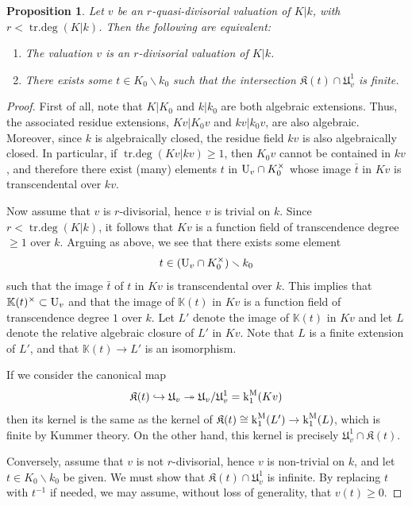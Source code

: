 \documentclass[11pt]{amsart}
\newtheorem{proposition}{Proposition}[section]
\theoremstyle{definition}
\theoremstyle{remark}
\numberwithin{equation}{section}
\DeclareMathOperator{\trdeg}{tr.deg}
\newcommand{\U}{{\rm U}}
\newcommand{\Kbb}{\mathbb{K}}
\newcommand{\Kfrak}{\mathfrak{K}}
\newcommand{\Ufrak}{\mathfrak{U}}
\renewcommand{\k}{\operatorname{k}^{\rm M}}
\begin{document}
\begin{proposition}
\label{proposition: localthy / pd / pd-detection}
  Let $v$ be an $r$-quasi-divisorial valuation of $K|k$, with $r < \trdeg(K|k)$.
  Then the following are equivalent:
  \begin{enumerate}
    \item The valuation $v$ is an $r$-divisorial valuation of $K|k$.
    \item There exists some $t \in K_0 \smallsetminus k_0$ such that the intersection $\Kfrak(t) \cap \Ufrak_v^1$ is finite.
  \end{enumerate}
\end{proposition}
\begin{proof}
  First of all, note that $K|K_0$ and $k|k_0$ are both algebraic extensions.
  Thus, the associated residue extensions, $Kv|K_0v$ and $kv|k_0v$, are also algebraic.
  Moreover, since $k$ is algebraically closed, the residue field $kv$ is also algebraically closed.
  In particular, if $\trdeg(Kv|kv) \geq 1$, then $K_0v$ cannot be contained in $kv$, and therefore there exist (many) elements $t$ in $\U_v \cap K_0^\times$ whose image $\bar t$ in $Kv$ is transcendental over $kv$.

  Now assume that $v$ is $r$-divisorial, hence $v$ is trivial on $k$.
  Since $r < \trdeg(K|k)$, it follows that $Kv$ is a function field of transcendence degree $\geq 1$ over $k$.
  Arguing as above, we see that there exists some element
  \[ t \in (\U_v \cap K_0^\times) \smallsetminus k_0 \]
  such that the image $\bar t$ of $t$ in $Kv$ is transcendental over $k$.
  This implies that $\Kbb(t)^\times \subset \U_v$ and that the image of $\Kbb(t)$ in $Kv$ is a function field of transcendence degree $1$ over $k$.
  Let $L'$ denote the image of $\Kbb(t)$ in $Kv$ and let $L$ denote the relative algebraic closure of $L'$ in $Kv$.
  Note that $L$ is a finite extension of $L'$, and that $\Kbb(t) \rightarrow L'$ is an isomorphism.

  If we consider the canonical map
  \[ \Kfrak(t) \hookrightarrow \Ufrak_v \twoheadrightarrow \Ufrak_v / \Ufrak_v^1 = \k_1(Kv) \]
  then its kernel is the same as the kernel of $\Kfrak(t) \cong \k_1(L') \rightarrow \k_1(L)$, which is finite by Kummer theory.
  On the other hand, this kernel is precisely $\Ufrak_v^1 \cap \Kfrak(t)$.

  Conversely, assume that $v$ is not $r$-divisorial, hence $v$ is non-trivial on $k$, and let $t \in K_0 \smallsetminus k_0$ be given.
  We must show that $\Kfrak(t) \cap \Ufrak_v^1$ is infinite.
  By replacing $t$ with $t^{-1}$ if needed, we may assume, without loss of generality, that $v(t) \geq 0$.


\end{proof}
\end{document}
